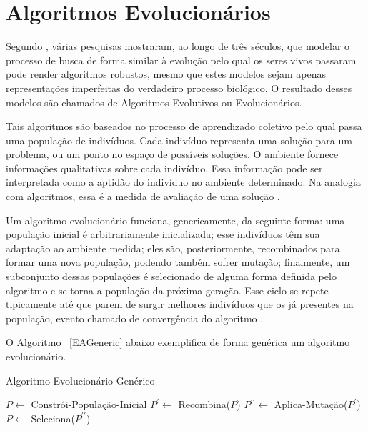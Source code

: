 \chapter{Algoritmos Evolucionários}

Segundo \citep{Back:1993:OEA:1326623.1326625}, várias pesquisas mostraram, ao 
longo de três séculos, que modelar o processo de busca de forma similar à evolução 
pelo qual os seres vivos passaram pode render algoritmos robustos, mesmo que 
estes modelos sejam apenas representações imperfeitas do verdadeiro processo 
biológico. O resultado desses modelos são chamados de Algoritmos Evolutivos ou 
Evolucionários.

Tais algoritmos são baseados no processo de aprendizado coletivo pelo qual passa 
uma população de indivíduos. Cada indivíduo representa uma solução para um 
problema, ou um ponto no espaço de possíveis soluções. O ambiente fornece 
informações qualitativas sobre cada indivíduo. Essa informação pode ser 
interpretada como a aptidão do indivíduo no ambiente determinado. Na 
analogia com algoritmos, essa é a medida de avaliação de uma solução 
\citep{Back:1993:OEA:1326623.1326625}.

Um algoritmo evolucionário funciona, genericamente, da seguinte forma: uma 
população inicial é arbitrariamente inicializada; esse indivíduos têm sua 
adaptação ao ambiente medida; eles são, posteriormente, recombinados para formar 
uma nova população, podendo também sofrer mutação; finalmente, um subconjunto 
dessas populações é selecionado de alguma forma definida pelo algoritmo e se 
torna a população da próxima geração. Esse ciclo se repete tipicamente até que 
parem de surgir melhores indivíduos que os já presentes na população, evento 
chamado de convergência do algoritmo \citep{Back:1993:OEA:1326623.1326625}.

O Algoritmo ~\ref{EAGeneric} abaixo exemplifica de forma genérica um algoritmo evolucionário.

\begin{algorithm}                      %
	\caption{Algoritmo Evolucionário Genérico}          %
	\label{EAGeneric}                           %
	\begin{algorithmic}                    %
		\State $P \gets $ Constrói-População-Inicial
		\Repeat
			\State $P^{\prime} \gets $ Recombina($P$)
			\State $P^{\prime \prime} \gets $ Aplica-Mutação($P^{\prime}$)
			\State $P \gets $ Seleciona($P^{\prime \prime}$)
		\EndProcedure
	\end{algorithmic}
\end{algorithm}


